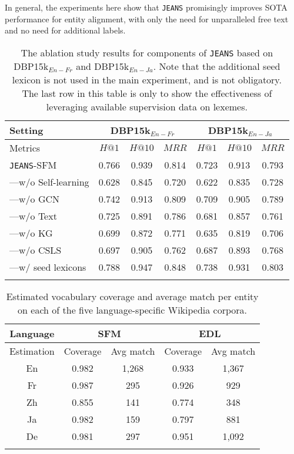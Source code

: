 \documentclass[11pt,a4paper]{article}
\makeatletter
\newcommand{\modelname}[0]{\texttt{JEANS}\xspace}
\def\bhline{\specialrule{.2em}{0em}{0em}}
\def\hitsone{\mathit{H}\mbox{@}1}
\def\hitsten{\mathit{H}\mbox{@}10}
\def\mrr{\mathit{MRR}}
\makeatother
\begin{document}
In general, the experiments here show that \modelname promisingly improves SOTA performance for entity alignment, with only the need for unparalleled free text and no need for additional labels.


{
\begin{table}[t]
\setlength\tabcolsep{1pt}
\centering
\footnotesize
\begin{tabular}{l|ccc|ccc}
\bhline
Setting&\multicolumn{3}{c|}{DBP15k$_{En-Fr}$}&\multicolumn{3}{c}{DBP15k$_{En-Ja}$}\\
\hline
Metrics&$\hitsone$&$\hitsten$&$\mrr$&$\hitsone$&$\hitsten$&$\mrr$\\
\bhline
\modelname-SFM&0.766&0.939&0.814&0.723&0.913&0.793\\
\hline
---w/o Self-learning&0.628&0.845&0.720&0.622&0.835&0.728\\
---w/o GCN&0.742&0.913&0.809&0.709&0.905&0.789\\
---w/o Text&0.725&0.891&0.786&0.681&0.857&0.761\\
---w/o KG&0.699&0.872&0.771&0.635&0.819&0.706\\
---w/o CSLS&0.697&0.905&0.762&0.687&0.893&0.768\\
---w/ seed lexicons&0.788&0.947&0.848&0.738&0.931&0.803\\
\bhline
\end{tabular}
\caption{The ablation study results for components of \modelname based on DBP15k$_{En-Fr}$ and DBP15k$_{En-Ja}$. Note that the additional seed lexicon is not used in the main experiment, and is not obligatory. The last row in this table is only to show the effectiveness of leveraging available supervision data on lexemes.}\label{tbl:ablation}
\end{table}
}

{
\begin{table}[t]
\setlength\tabcolsep{2pt}
\centering
\footnotesize
\begin{tabular}{c|cc|cc}
\bhline
Language&\multicolumn{2}{c|}{SFM}&\multicolumn{2}{c}{EDL}\\
\hline
Estimation&Coverage&Avg match&Coverage&Avg match\\
\hline
En&0.982&1,268&0.933&1,367\\
Fr&0.987&295&0.926&929\\
Zh&0.855&141&0.774&348\\
Ja&0.982&159&0.797&881\\
De&0.981&297&0.951&1,092\\
\bhline
\end{tabular}
\caption{Estimated vocabulary coverage and average match per entity on each of the five language-specific Wikipedia corpora. }\label{tbl:statgrounding}
\end{table}
} 
\end{document}
